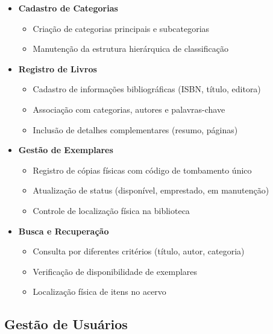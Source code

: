 \documentclass[12pt,a4paper]{article}
\begin{document}
\begin{conceptbox}
\begin{itemize}
    \item \textbf{Cadastro de Categorias}
    \begin{itemize}
        \item Criação de categorias principais e subcategorias
        \item Manutenção da estrutura hierárquica de classificação
    \end{itemize}

    \item \textbf{Registro de Livros}
    \begin{itemize}
        \item Cadastro de informações bibliográficas (ISBN, título, editora)
        \item Associação com categorias, autores e palavras-chave
        \item Inclusão de detalhes complementares (resumo, páginas)
    \end{itemize}

    \item \textbf{Gestão de Exemplares}
    \begin{itemize}
        \item Registro de cópias físicas com código de tombamento único
        \item Atualização de status (disponível, emprestado, em manutenção)
        \item Controle de localização física na biblioteca
    \end{itemize}

    \item \textbf{Busca e Recuperação}
    \begin{itemize}
        \item Consulta por diferentes critérios (título, autor, categoria)
        \item Verificação de disponibilidade de exemplares
        \item Localização física de itens no acervo
    \end{itemize}
\end{itemize}
\end{conceptbox}

\subsection{Gestão de Usuários}
\end{document}
